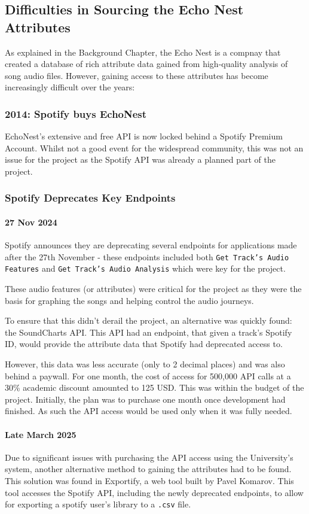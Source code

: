 \subsection{Difficulties in Sourcing the Echo Nest Attributes}
As explained in the Background Chapter, the Echo Nest is a compnay that created a database of rich attribute data gained from high-quality analysis of song audio files. However, gaining access to these attributes has become increasingly difficult over the years:

\subsubsection{2014: Spotify buys EchoNest} EchoNest's extensive and free API is now locked behind a Spotify Premium Account. Whilst not a good event for the widespread community, this was not an issue for the project as the Spotify API was already a planned part of the project.

\subsubsection{Spotify Deprecates Key Endpoints}
\paragraph{27 Nov 2024} Spotify announces they are deprecating several endpoints for applications made after the 27th November - these endpoints included both \texttt{Get Track's Audio Features} and \texttt{Get Track's Audio Analysis} which were key for the project.

These audio features (or attributes) were critical for the project as they were the basis for graphing the songs and helping control the audio journeys.

To ensure that this didn't derail the project, an alternative was quickly found: the SoundCharts API. This API had an endpoint, that given a track's Spotify ID, would provide the attribute data that Spotify had deprecated access to.

However, this data was less accurate (only to 2 decimal places) and was also behind a paywall. For one month, the cost of access for 500,000 API calls at a 30\% academic discount amounted to 125 USD. This was within the budget of the project. Initially, the plan was to purchase one month once development had finished. As such the API access would be used only when it was fully needed.

\paragraph{Late March 2025} Due to significant issues with purchasing the API access using the University's system, another alternative method to gaining the attributes had to be found. This solution was found in Exportify, a web tool built by Pavel Komarov. This tool accesses the Spotify API, including the newly deprecated endpoints, to allow for exporting a spotify user's library to a \lstinline|.csv| file.

